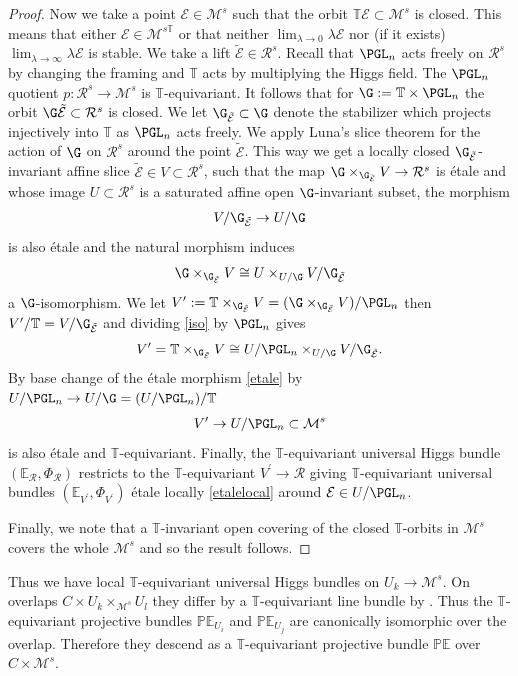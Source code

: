 \documentclass[12pt]{article}
\numberwithin{equation}{section}
\theoremstyle{remark}
\theoremstyle{definition}
\numberwithin{theorem}{section}
\def\beq{\begin{eqnarray}}
\def\eeq{\end{eqnarray}}
\def\bP{{\mathbb P}}
\def\calE{{\mathcal E}}
\def\bE{{\mathbb{E}}}
\def\bPhi{{\mathbb{\Phi}}}
\def\E{\mathbb{E}}
\def\M{{\mathcal{M}}}
\newcommand{\T}{{\mathbb{T}}}
\newcommand{\calR}{\mathcal{R}}
\renewcommand{\1}{\mathbbm{1}}
\begin{document}
\begin{proof}
	Now we take a  point $\calE\in \M^{s}$ such that the orbit $\T\calE\subset \M^s$ is closed. This means that  either  $\calE\in \M^{s\T}$ or that  neither $\lim_{\lambda\to 0}\lambda\calE$ nor (if it exists) $\lim_{\lambda\to \infty}\lambda\calE$ is stable. We take  a lift $\tilde{\calE}\in \calR^s$. Recall that $\PGL_n$ acts freely on $\calR^s$ by changing the framing and $\T$ acts by multiplying the Higgs field. The $\PGL_n$ quotient $p:\calR^s\to \M^s$ is $\T$-equivariant. It follows  that for $\G:=\T\times \PGL_n$ the orbit $\G\tilde{\calE}\subset \calR^s$ is closed. We let $\G_{\tilde{\calE}}\subset \G$ denote the stabilizer which projects injectively into $\T$ as $\PGL_n$ acts freely.  We apply Luna's slice theorem \cite[Theorem III.1]{luna} for the action of $\G$ on $\calR^s$ around the point $\tilde{\calE}$. This way we get a locally closed $\G_{\tilde{\calE}}$-invariant affine slice $\tilde{\calE} \in V\subset \calR^s$, such that the map  $\G\times_{\G_{\tilde{\calE}}} V \to \calR^s$ is \'etale and whose image $U\subset \calR^s$ is  a saturated affine open $\G$-invariant subset, the morphism \beq \label{etale}V/\G_{\tilde{\calE}} \to U/\G\eeq is also \'etale and the natural morphism induces \beq \label{iso}\G\times_{\G_{\tilde{\calE}}} V \cong U\times_{U/\G} V/\G_{\tilde{\calE}}\eeq a $\G$-isomorphism.  We let $V^\prime:=\T\times_{\G_{\tilde{\calE}}}V=(\G\times_{\G_{\tilde{\calE}}}V)/\PGL_n$ then $V^\prime/\T=V/\G_{\tilde{\calE}}$ and dividing \eqref{iso} by $\PGL_n$ gives $$V^\prime=\T\times_{\G_{\tilde{\calE}}} V\cong U/\PGL_n\times_{U/\G} V/\G_{\tilde{\calE}}.$$ By base change of the \'etale morphism \eqref{etale}  by $U/{\PGL_n}\to U/\G=(U/\PGL_n)/\T$  \beq\label{etalelocal}V^\prime \to U/\PGL_n\subset \M^s\eeq is also \'etale and $\T$-equivariant. Finally, the $\T$-equivariant universal Higgs bundle $(\bE_\calR,\bPhi_{\calR})$ restricts to the $\T$-equivariant $V^\prime\to  \calR$ giving  $\T$-equivariant universal bundles $(\bE_{V^\prime},\bPhi_{V^\prime})$ \'etale locally \eqref{etalelocal} around $\calE\in U/\PGL_n$. 
	
	Finally, we note that a $\T$-invariant open covering of the closed $\T$-orbits in $\M^s$ covers the whole $\M^s$ and so the result follows.  
	
\end{proof}

Thus we have local $\T$-equivariant universal Higgs bundles on $U_k\to \M^s$. On overlaps $C\times U_k\times_{\M^s} U_l$ they differ by a $\T$-equivariant line bundle by \cite[(4.2)]{hausel-thaddeus}. Thus the $\T$-equivariant projective bundles $\bP\E_{U_i}$ and $\bP\E_{U_j}$ are canonically isomorphic over the overlap. Therefore they descend as a $\T$-equivariant projective bundle $\bP\E$ over $C\times \M^s$. 
\end{document}
